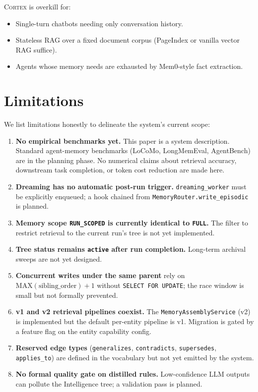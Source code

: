 \documentclass[11pt,a4paper]{article}
\theoremstyle{cortexprop}
\newcommand{\code}[1]{\texttt{#1}}
\begin{document}
\textsc{Cortex} is overkill for:

\begin{itemize}
  \item Single-turn chatbots needing only conversation history.
  \item Stateless RAG over a fixed document corpus (PageIndex or vanilla
  vector RAG suffice).
  \item Agents whose memory needs are exhausted by Mem0-style fact
  extraction.
\end{itemize}

\section{Limitations}
\label{sec:limits}

We list limitations honestly to delineate the system's current scope:

\begin{enumerate}
  \item \textbf{No empirical benchmarks yet.} This paper is a system
  description. Standard agent-memory benchmarks (LoCoMo, LongMemEval,
  AgentBench) are in the planning phase. No numerical claims about
  retrieval accuracy, downstream task completion, or token cost
  reduction are made here.

  \item \textbf{Dreaming has no automatic post-run trigger.}
  \code{dreaming\_worker} must be explicitly enqueued; a hook chained
  from \code{MemoryRouter.write\_episodic} is planned.

  \item \textbf{Memory scope \code{RUN\_SCOPED} is currently identical
  to \code{FULL}.} The filter to restrict retrieval to the current
  run's tree is not yet implemented.

  \item \textbf{Tree status remains \code{active} after run completion.}
  Long-term archival sweeps are not yet designed.

  \item \textbf{Concurrent writes under the same parent} rely on
  $\text{MAX}(\text{sibling\_order}) + 1$ without \code{SELECT FOR
  UPDATE}; the race window is small but not formally prevented.

  \item \textbf{v1 and v2 retrieval pipelines coexist.} The
  \code{MemoryAssemblyService} (v2) is implemented but the default
  per-entity pipeline is v1. Migration is gated by a feature flag on
  the entity capability config.

  \item \textbf{Reserved edge types} (\code{generalizes},
  \code{contradicts}, \code{supersedes}, \code{applies\_to}) are
  defined in the vocabulary but not yet emitted by the system.

  \item \textbf{No formal quality gate on distilled rules.}
  Low-confidence LLM outputs can pollute the Intelligence tree; a
  validation pass is planned.
\end{enumerate}
\end{document}
